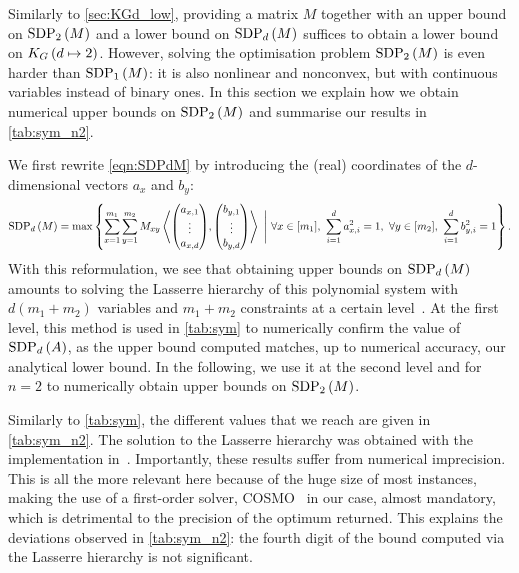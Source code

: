 \documentclass[10pt,aps,notitlepage,onecolumn,pra,superscriptaddress]{revtex4-1}
\newcommand{\innp}[2]{\left\langle{#1},{#2}\right\rangle}
\newcommand\KG[2]{K_G\left({#1}\ifx#2\empty\else\mapsto\fi{#2}\right)}
\newcommand\sdp[2]{\mathrm{SDP}_{#1}\ifx#2\empty\else\left({#2}\right)\fi}
\begin{document}
Similarly to \cref{sec:KGd_low}, providing a matrix $M$ together with an upper bound on $\sdp{2}{M}$ and a lower bound on $\sdp{d}{M}$ suffices to obtain a lower bound on $\KG{d}{2}$.
However, solving the optimisation problem $\sdp{2}{M}$ is even harder than $\sdp{1}{M}$: it is also nonlinear and nonconvex, but with continuous variables instead of binary ones.
In this section we explain how we obtain numerical upper bounds on $\sdp{2}{M}$ and summarise our results in \cref{tab:sym_n2}.

We first rewrite \cref{eqn:SDPdM} by introducing the (real) coordinates of the $d$-dimensional vectors $a_x$ and $b_y$:
\begin{equation}
  \sdp{d}{M}=\max\left\{\sum_{x=1}^{m_1}\sum_{y=1}^{m_2} M_{xy}\innp{\begin{pmatrix}a_{x,1}\\\vdots\\a_{x,d}\end{pmatrix}}{\begin{pmatrix}b_{y,1}\\\vdots\\b_{y,d}\end{pmatrix}}~\Bigg|~\forall x\in[m_1],~\sum_{i=1}^da_{x,i}^2=1,~\forall y\in[m_2],~\sum_{i=1}^db_{y,i}^2=1\right\}.
\end{equation}
With this reformulation, we see that obtaining upper bounds on $\sdp{d}{M}$ amounts to solving the Lasserre hierarchy of this polynomial system with $d(m_1+m_2)$ variables and $m_1+m_2$ constraints at a certain level~\cite{Las01}.
At the first level, this method is used in \cref{tab:sym} to numerically confirm the value of $\sdp{d}{A}$, as the upper bound computed matches, up to numerical accuracy, our analytical lower bound.
In the following, we use it at the second level and for $n=2$ to numerically obtain upper bounds on $\sdp{2}{M}$.

Similarly to \cref{tab:sym}, the different values that we reach are given in \cref{tab:sym_n2}.
The solution to the Lasserre hierarchy was obtained with the implementation in~\cite{WML21a}.
Importantly, these results suffer from numerical imprecision.
This is all the more relevant here because of the huge size of most instances, making the use of a first-order solver, COSMO~\cite{GCG21} in our case, almost mandatory, which is detrimental to the precision of the optimum returned.
This explains the deviations observed in \cref{tab:sym_n2}: the fourth digit of the bound computed via the Lasserre hierarchy is not significant.
\end{document}
